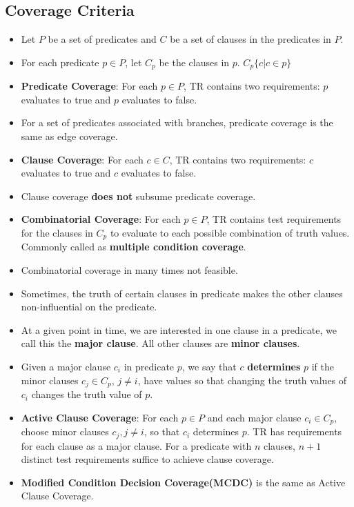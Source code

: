 \documentclass[a4paper]{article}
\begin{document}
\subsection{Coverage Criteria}
\begin{itemize}
    \item Let $P$ be a set of predicates and $C$ be a set of clauses in the predicates in $P$.
    \item For each predicate $p\in P$, let $C_p$ be the clauses in $p$. $C_p\{c|c\in p\}$
    \item \textbf{Predicate Coverage}: For each $p\in P$, TR contains two requirements: $p$ evaluates to true and $p$ evaluates to false.
    \item For a set of predicates associated with branches, predicate coverage is the same as edge coverage.
    \item \textbf{Clause Coverage}: For each $c\in C$, TR contains two requirements: $c$ evaluates to true and $c$ evaluates to false.
    \item Clause coverage \textbf{does not} subsume predicate coverage.
    \item \textbf{Combinatorial Coverage}: For each $p\in P$, TR contains test requirements for the clauses in $C_p$ to evaluate to each possible combination of truth values. Commonly called as \textbf{multiple condition coverage}.
    \item Combinatorial coverage in many times not feasible.
    \item Sometimes, the truth of certain clauses in predicate makes the other clauses non-influential on the predicate.
    \item At a given point in time, we are interested in one clause in a predicate, we call this the \textbf{major clause}. All other clauses are \textbf{minor clauses}.
    \item  Given a major clause $c_i$ in predicate $p$, we say that $c$ \textbf{determines} $p$ if the minor clauses $c_j\in C_p$, $j\neq i$, have values so that changing the truth values of $c_i$ changes the truth value of $p$. 
    \item \textbf{Active Clause Coverage}: For each $p\in P$ and each major clause $c_i\in C_p$, choose minor clauses $c_j, j\neq i$, so that $c_i$ determines $p$. TR has requirements for each clause as a major clause. For a predicate with $n$ clauses, $n+1$ distinct test requirements suffice to achieve clause coverage.
    \item \textbf{Modified Condition Decision Coverage(MCDC)} is the same as Active Clause Coverage.

\end{itemize}
\end{document}
